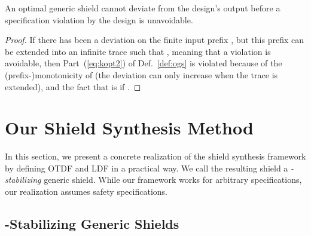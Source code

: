\documentclass{llncs}
\begin{document}
\begin{proposition}
An optimal generic shield  cannot deviate from the design's 
output before a specification violation by the design  is 
unavoidable.
\end{proposition}
\begin{proof}
If there has been a deviation  on the finite input prefix , but this 
prefix can be extended into an infinite trace  such that 
, meaning that a violation is 
avoidable, then Part~(\ref{eq:kopt2}) of Def.~\ref{def:ogs} is violated 
because of the (prefix-)monotonicity of  (the deviation can only 
increase when the trace is extended), and the fact that  is  if .
\end{proof}

\section{Our Shield Synthesis Method}
\label{sec:sol}

In this section, we present a concrete realization of the shield 
synthesis framework by defining OTDF and LDF in a practical way. We call 
the resulting shield a \emph{-stabilizing} generic shield. While our 
framework works for arbitrary specifications, our realization assumes 
safety specifications.  

\subsection{-Stabilizing Generic Shields}
\end{document}
